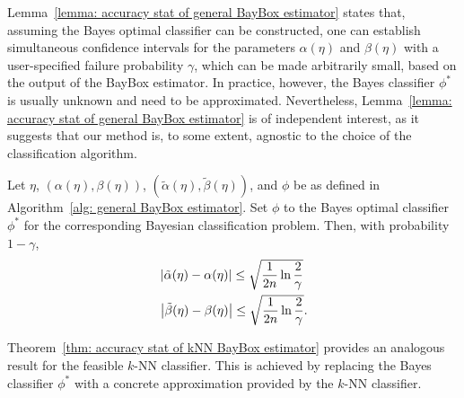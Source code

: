 Lemma~\ref{lemma: accuracy stat of general BayBox estimator} states that, assuming the Bayes optimal classifier can be constructed, one can establish simultaneous confidence intervals for the parameters $\alpha(\eta)$ and $\beta(\eta)$ with a user-specified failure probability $\gamma$, which can be made arbitrarily small, based on the output of the BayBox estimator. In practice, however, the Bayes classifier $\phi^*$ is usually unknown and need to be approximated. Nevertheless, Lemma~\ref{lemma: accuracy stat of general BayBox estimator} is of independent interest, as it suggests that our method is, to some extent, agnostic to the choice of the classification algorithm.

\begin{lem}%
    \label{lemma: accuracy stat of general BayBox estimator}
    Let $\eta$, $(\alpha(\eta), \beta(\eta))$, $(\tilde{\alpha}(\eta), \tilde{\beta}(\eta))$, and $\phi$ be as defined in Algorithm~\ref{alg: general BayBox estimator}. Set $\phi$ to the Bayes optimal classifier $\phi^*$ for the corresponding Bayesian classification problem.
    Then, with probability $1 - \gamma$,
    \begin{align*}
    &\left| {\tilde{\alpha}(\eta) - \alpha(\eta)} \right| \leq \sqrt{\frac{1}{2n}\ln{\frac{2}{\gamma}}} \\
    &\left| {\tilde{\beta}(\eta) - \beta(\eta)} \right| \leq \sqrt{\frac{1}{2n}\ln{\frac{2}{\gamma}}}.
    \end{align*}
\end{lem}


Theorem~\ref{thm: accuracy stat of kNN BayBox estimator} provides an analogous result for the feasible $k$-NN classifier. This is achieved by replacing the Bayes classifier $\phi^*$ with a concrete approximation provided by the $k$-NN classifier.

